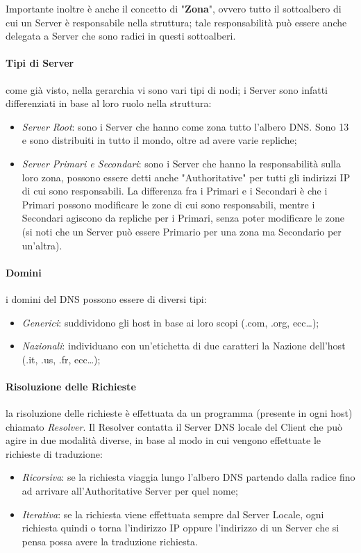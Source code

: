 \documentclass[a4paper]{article}
\begin{document}
				Importante inoltre è anche il concetto di "\textbf{Zona}", ovvero tutto il sottoalbero di cui un Server è responsabile nella struttura; tale responsabilità può essere anche delegata a Server che sono radici in questi sottoalberi.
			
			\paragraph{Tipi di Server}
				come già visto, nella gerarchia vi sono vari tipi di nodi; i Server sono infatti differenziati in base al loro ruolo nella struttura:
				\begin{itemize}
					\item \emph{Server Root}: sono i Server che hanno come zona tutto l'albero DNS. Sono 13 e sono distribuiti in tutto il mondo, oltre ad avere varie repliche;
					\item \emph{Server Primari e Secondari}: sono i Server che hanno la responsabilità sulla loro zona, possono essere detti anche "Authoritative" per tutti gli indirizzi IP di cui sono responsabili. La differenza fra i Primari e i Secondari è che i Primari possono modificare le zone di cui sono responsabili, mentre i Secondari agiscono da repliche per i Primari, senza poter modificare le zone (si noti che un Server può essere Primario per una zona ma Secondario per un'altra).
				\end{itemize}
				
			\paragraph{Domini}
				i domini del DNS possono essere di diversi tipi:
				\begin{itemize}
					\item \emph{Generici}: suddividono gli host in base ai loro scopi (.com, .org, ecc\dots);
					\item \emph{Nazionali}: individuano con un'etichetta di due caratteri la Nazione dell'host (.it, .us, .fr, ecc\dots);
				\end{itemize}
				
			\paragraph{Risoluzione delle Richieste}
				la risoluzione delle richieste è effettuata da un programma (presente in ogni host) chiamato \emph{Resolver}.
				Il Resolver contatta il Server DNS locale del Client che può agire in due modalità diverse, in base al modo in cui vengono effettuate le richieste di traduzione:
				\begin{itemize}
					\item \emph{Ricorsiva}: se la richiesta viaggia lungo l'albero DNS partendo dalla radice fino ad arrivare all'Authoritative Server per quel nome;
					\item \emph{Iterativa}: se la richiesta viene effettuata sempre dal Server Locale, ogni richiesta quindi o torna l'indirizzo IP oppure l'indirizzo di un Server che si pensa possa avere la traduzione richiesta.
				\end{itemize}
				
\end{document}
